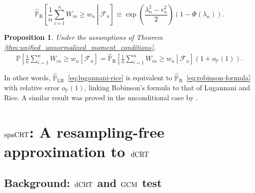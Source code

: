 \documentclass[12pt]{article}
\newtheorem{proposition}{Proposition}
\theoremstyle{definition}
\def\P{\mathbb{P}}
\def\P{\mathbb{P}}
\renewcommand{\P}{\mathbb{P}}							%
\newcommand{\dCRT}{\textnormal{dCRT}} 					%
\newcommand{\GCM}{\textnormal{GCM}}						%
\newcommand{\spacrt}{\textnormal{spaCRT}}               %
\begin{document}
  \begin{equation}
	\widehat{\P}_\text{R}\left[\left.\frac{1}{n}\sum_{i = 1}^n W_{in} \geq w_n\ \right|\ \mathcal{F}_n\right] \equiv \exp\left(\frac{\lambda_n^2-r_n^2}{2}\right)(1-\Phi(\lambda_n)).
	\label{eq:robinson-formula}
  \end{equation}
  \begin{proposition}\label{prop:equivalence_spa_formula}
	Under the assumptions of Theorem \ref{thm:unified_unnormalized_moment_conditions},   
	\begin{align}\label{eq:alternative_spa_formula}
	  \P\left[\left.\frac{1}{n}\sum_{i = 1}^n W_{in} \geq w_n\ \right|\ \mathcal{F}_n\right]=\widehat{\P}_\text{R}\left[\left.\frac{1}{n}\sum_{i = 1}^n W_{in} \geq w_n\ \right|\ \mathcal{F}_n\right](1+o_\P(1)).
	  \end{align}
  \end{proposition}
  \noindent In other words, $\widehat{\P}_\text{LR}$~\eqref{eq:lugannani-rice} is equivalent to $\widehat{\P}_\text{R}$~\eqref{eq:robinson-formula} with relative error $o_\P(1)$, linking Robinson's formula to that of Lugannani and Rice. A similar result was proved in the unconditional case by \citet{Kolassa2007}.
  
  \section{$\spacrt$: A resampling-free approximation to $\dCRT$} \label{sec:spacrt}
  
  \subsection{Background: $\dCRT$ and $\GCM$ test}\label{sec:background}
  
\end{document}
